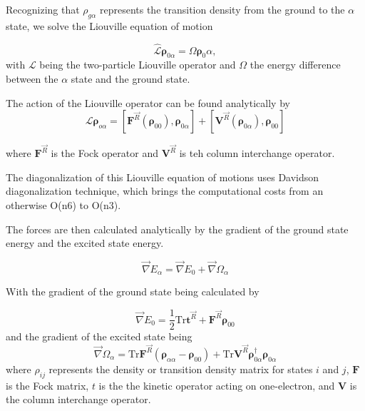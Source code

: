     Recognizing that \(\rho_{g\alpha}\) represents the transition density from the ground to the \(\alpha\) state, we solve the Liouville equation of motion 

    \begin{equation}
	\hat{\mathcal{L}}\bm{\rho}_{0\alpha} = \Omega \bm{\rho}_0\alpha,
    \end{equation}
    with \(\mathcal{L}\) being the two-particle Liouville operator and \(\Omega\) the energy difference between the \(\alpha\) state and the ground state.

    The action of the Liouville operator can be found analytically by
    \begin{equation}
    \mathcal{L} \bm{\rho}_{o\alpha} = \left[ \bm{F}^{\vec{R}} (\bm{\rho}_{00}),\bm{\rho}_{0\alpha} \right] +
    \left[ \bm{V}^{\vec{R}} (\bm{\rho}_{0\alpha}), \bm{\rho}_{00} \right]
    \end{equation}

    where \(\bm{F}^{\vec{R}}\) is the Fock operator and \(\bm{V}^{\vec{R}}\) is teh column interchange operator.

    The diagonalization of this Liouville equation of motions uses Davidson diagonalization technique, which brings the computational costs from an otherwise O(n6) to O(n3). 

    The forces are then calculated analytically by the gradient of the ground state energy and the excited state energy. 

    \begin{equation}
    \vec{\nabla} E_\alpha = \vec{\nabla} E_0 + \vec{\nabla}\Omega_\alpha
    \end{equation}

    With the gradient of the ground state being calculated by

    \begin{equation}
    \vec{\nabla}E_0 = \frac{1}{2} \text{Tr} \bm{t}^{\vec{R}} + \bm{F}^{\vec{R}}\bm{\rho}_{00}
    \end{equation}
    and the gradient of the excited state being 
    \begin{equation}
    \vec{\nabla}\Omega_\alpha = \text{Tr} \bm{F}^{\vec{R}} \left( \bm{\rho}_{\alpha\alpha} - \bm{\rho}_{00} \right) + \text{Tr} \bm{V}^{\vec{R}} \bm{\rho}_{0\alpha}^\dagger \bm{\rho}_{0\alpha}
    \end{equation}
    where \(\rho_{ij}\) represents the density or transition density matrix for states \(i\) and \(j\),
    \(\bm{F}\) is the Fock matrix,
    \(t\) is the the kinetic operator acting on one-electron, and \(\bm{V}\) is the column interchange operator.


